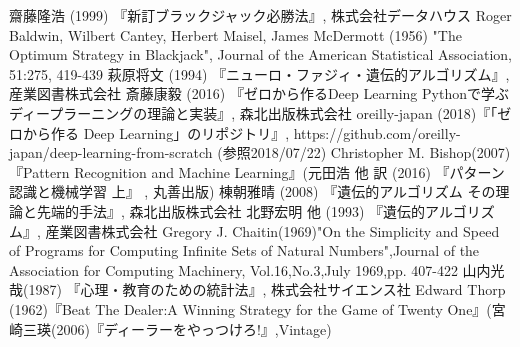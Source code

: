 \begin{thebibliography}{9}
   齋藤隆浩 (1999) 『新訂ブラックジャック必勝法』, 株式会社データハウス
   Roger Baldwin, Wilbert Cantey, Herbert Maisel, James McDermott (1956) "The Optimum Strategy in Blackjack", Journal of the American Statistical Association, 51:275, 419-439
   萩原将文 (1994) 『ニューロ・ファジィ・遺伝的アルゴリズム』, 産業図書株式会社
   斎藤康毅 (2016) 『ゼロから作るDeep Learning Pythonで学ぶディープラーニングの理論と実装』, 森北出版株式会社
   oreilly-japan (2018)『「ゼロから作る Deep Learning」のリポジトリ』, https://github.com/oreilly-japan/deep-learning-from-scratch (参照2018/07/22) 
   Christopher M. Bishop(2007)『Pattern Recognition and Machine Learning』(元田浩 他 訳 (2016) 『パターン認識と機械学習 上』 , 丸善出版)
   棟朝雅晴 (2008) 『遺伝的アルゴリズム その理論と先端的手法』, 森北出版株式会社
   北野宏明 他 (1993) 『遺伝的アルゴリズム』, 産業図書株式会社
   Gregory J. Chaitin(1969)"On the Simplicity and Speed of Programs for Computing Infinite Sets of Natural Numbers",Journal of the Association for Computing Machinery, Vol.16,No.3,July 1969,pp. 407-422
   山内光哉(1987) 『心理・教育のための統計法』, 株式会社サイエンス社
   Edward Thorp (1962)『Beat The Dealer:A Winning Strategy for the Game of Twenty One』(宮崎三瑛(2006)『ディーラーをやっつけろ!』,Vintage)
\end{thebibliography}
